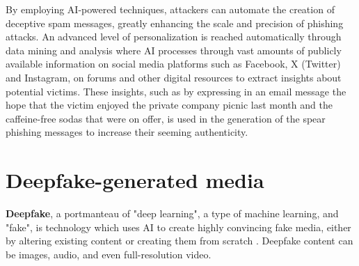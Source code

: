 By employing AI-powered techniques, attackers can automate the creation of deceptive spam messages, greatly enhancing the scale and precision of phishing attacks. An advanced level of personalization is reached automatically through data mining and analysis where AI processes through vast amounts of publicly available information on social media platforms such as Facebook, X (Twitter) and Instagram, on forums and other digital resources to extract insights about potential victims. These insights, such as by expressing in an email message the hope that the victim enjoyed the private company picnic last month and the caffeine-free sodas that were on offer, is used in the generation of the spear phishing messages to increase their seeming authenticity.







\section{Deepfake-generated media}
\begin{comment}
    
    -

\end{comment}

\textbf{Deepfake}, a portmanteau of "deep learning", a type of machine learning, and "fake", is technology which uses AI to create highly convincing fake media, either by altering existing content or creating them from scratch \citep{mirskyTheCreationAndDetectionOfDeepfakes2021}. Deepfake content can be images, audio, and even full-resolution video.

